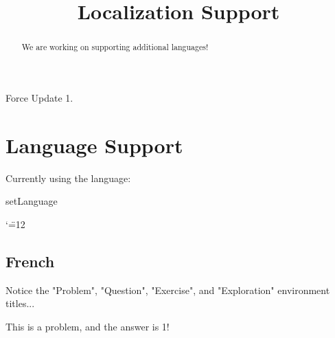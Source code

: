 \documentclass{ximera}
\title{Localization Support}
\begin{document}
\begin{abstract}%
    We are working on supporting additional languages!
\end{abstract}
\maketitle

Force Update 1.

\section*{Language Support}%

\makeatletter
{}


Currently using the language:  %

\ifcsname setLanguage\endcsname \else \newcommand{\setLanguage}[1]{} \fi

\makeatother

\catcode`\"=12

    \subsection*{French}%
    
        Notice the "Problem", "Question", "Exercise", and "Exploration" environment titles... 
        \begin{problem}%
            This is a problem, and the answer is 1! %
            \begin{multipleChoice}
            \end{multipleChoice}%
        \end{problem}
            
\end{document}
